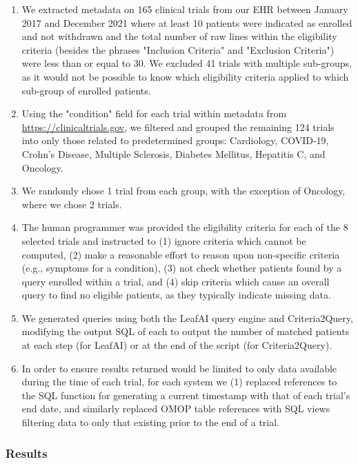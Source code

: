 \documentclass[../main.tex]{subfiles}
\begin{document}
\begin{enumerate}
    \item We extracted metadata on 165 clinical trials from our EHR between January 2017 and December 2021 where at least 10 patients were indicated as enrolled and not withdrawn and the total number of raw lines within the eligibility criteria (besides the phrases "Inclusion Criteria" and "Exclusion Criteria") were less than or equal to 30. We excluded 41 trials with multiple sub-groups, as it would not be possible to know which eligibility criteria applied to which sub-group of enrolled patients.
    \item Using the "condition" field for each trial within metadata from \url{https://clinicaltrials.gov}, we filtered and grouped the remaining 124 trials into only those related to predetermined groups: Cardiology, COVID-19, Crohn's Disease, Multiple Sclerosis, Diabetes Mellitus, Hepatitis C, and Oncology. 
    \item We randomly chose 1 trial from each group, with the exception of Oncology, where we chose 2 trials.
    \item The human programmer was provided the eligibility criteria for each of the 8 selected trials and instructed to (1) ignore criteria which cannot be computed, (2) make a reasonable effort to reason upon non-specific criteria (e.g., symptoms for a condition), (3) not check whether patients found by a query enrolled within a trial, and (4) skip criteria which cause an overall query to find no eligible patients, as they typically indicate missing data.
    \item We generated queries using both the LeafAI query engine and Criteria2Query, modifying the output SQL of each to output the number of matched patients at each step (for LeafAI) or at the end of the script (for Criteria2Query). 
    \item In order to ensure results returned would be limited to only data available during the time of each trial, for each system we (1) replaced references to the SQL function for generating a current timestamp with that of each trial's end date, and similarly replaced OMOP table references with SQL views filtering data to only that existing prior to the end of a trial.
\end{enumerate}

\subsubsection{Results}
\end{document}
